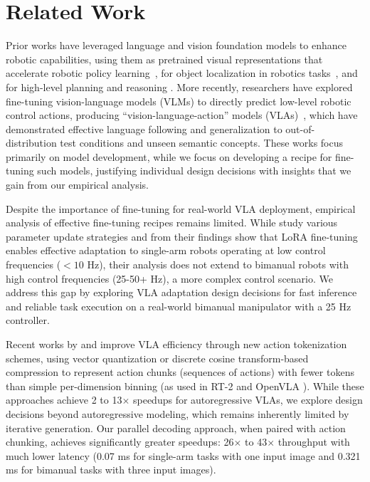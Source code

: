 \documentclass[conference]{IEEEtran}
\begin{document}
\section{Related Work}
\label{sec:related_work}

Prior works have leveraged language and vision foundation models to enhance robotic capabilities, using them as pretrained visual representations that accelerate robotic policy learning~\citep{ma2022vip, nair2022r3m, ma2023liv, Karamcheti2023LanguageDrivenRL, majumdar2023we}, for object localization in robotics tasks~\citep{gadre2023cows, stone2023open}, and for high-level planning and reasoning \citep{ahn2022icanisay, huang2022innermonologueembodiedreasoning,  singh2022progpromptgeneratingsituatedrobot, huang2022languagemodelszeroshotplanners, song2023llmplannerfewshotgroundedplanning, huang2023voxposer, duan2024manipulate}. More recently, researchers have explored fine-tuning vision-language models (VLMs) to directly predict low-level robotic control actions, producing ``vision-language-action'' models (VLAs)~\citep{brohan2023rt, o2023open, li2023vision, kim2024openvla, durante2024interactive, huang2023embodied, covariant_ai_2024,wayve_ai_2024,zhen20243dvla, wen2024tinyvla, black2024pi_0, belkhale2024minivla}, which have demonstrated effective language following \citep{zhou2023language} and generalization to out-of-distribution test conditions and unseen semantic concepts. These works focus primarily on model development, while we focus on developing a recipe for fine-tuning such models, justifying individual design decisions with insights that we gain from our empirical analysis.

Despite the importance of fine-tuning for real-world VLA deployment, empirical analysis of effective fine-tuning recipes remains limited. While \citet{kim2024openvla} study various parameter update strategies and from their findings show that LoRA fine-tuning enables effective adaptation to single-arm robots operating at low control frequencies ($<10$ Hz), their analysis does not extend to bimanual robots with high control frequencies (25-50+ Hz), a more complex control scenario. We address this gap by exploring VLA adaptation design decisions for fast inference and reliable task execution on a real-world bimanual manipulator with a 25 Hz controller.

Recent works by \citet{belkhale2024minivla} and \citet{pertsch2025fastefficientactiontokenization} improve VLA efficiency through new action tokenization schemes, using vector quantization or discrete cosine transform-based compression to represent action chunks (sequences of actions) with fewer tokens than simple per-dimension binning (as used in RT-2 \cite{brohan2023rt} and OpenVLA \citep{kim2024openvla}). While these approaches achieve 2 to 13$\times$ speedups for autoregressive VLAs, we explore design decisions beyond autoregressive modeling, which remains inherently limited by iterative generation. Our parallel decoding approach, when paired with action chunking, achieves significantly greater speedups: 26$\times$ to 43$\times$ throughput with much lower latency (0.07 ms for single-arm tasks with one input image and 0.321 ms for bimanual tasks with three input images).
\end{document}

